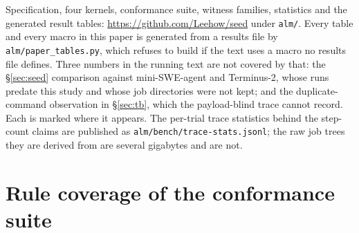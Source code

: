 \documentclass[11pt,a4paper]{article}
\begin{document}
Specification, four kernels, conformance suite, witness families, statistics
and the generated result tables: \url{https://github.com/Leehow/seed} under
\texttt{alm/}. Every table and every macro in this paper is generated from a
results file by \texttt{alm/paper\_tables.py}, which refuses to build if the
text uses a macro no results file defines. Three numbers in the running text
are not covered by that: the \S\ref{sec:seed} comparison against
mini-SWE-agent and Terminus-2, whose runs predate this study and whose job
directories were not kept; and the duplicate-command observation in
\S\ref{sec:tb}, which the payload-blind trace cannot record. Each is marked
where it appears. The per-trial trace statistics behind the step-count claims
are published as \texttt{alm/bench/trace-stats.jsonl}; the raw job trees they
are derived from are several gigabytes and are not.

\appendix
\section{Rule coverage of the conformance suite}

\begin{table}[h]\centering\small
\caption{Every transition in the specification and how often the suite fires
it. Generated with the cases.}
\label{tab:coverage}

\end{table}



\end{document}

